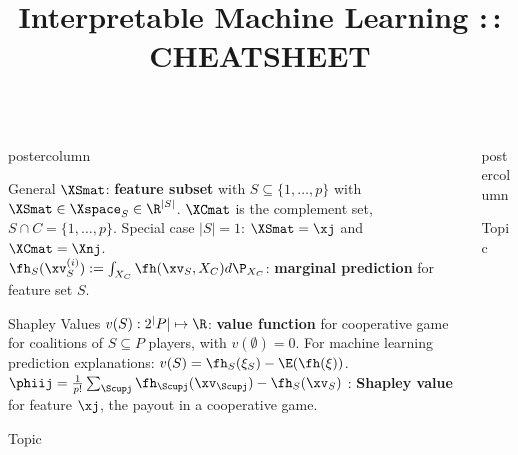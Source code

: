 \documentclass{beamer}
\title{Interpretable Machine Learning :\,: CHEATSHEET} %
\newlength{\columnheight} %
\begin{document}
\begin{frame}[fragile]{}
\vspace{-8ex}
\begin{columns}
	\begin{column}{.31\textwidth}
		\begin{beamercolorbox}[center]{postercolumn}
			\begin{minipage}{.98\textwidth}
				\parbox[t][\columnheight]{\textwidth}{
\begin{myblock}{General} \vspace{-2ex}
  $\XSmat$: \textbf{feature subset} with $S \subseteq \{1, \ldots, p\}$  with $\XSmat \in \Xspace_S \in \R^{|S|}$. $\XCmat$ is the complement set, $S \cap C = \{1, \ldots, p\}$. Special case $|S| = 1$: $\XSmat = \xj$ and $\XCmat = \Xnj$. \\

  $\fh_{S}(\xv_S^{(i)}) := \int_{X_C} \fh(\xv_S, X_C)d \P_{X_C}$: \textbf{marginal prediction} for feature set $S$. \\
\end{myblock}


\begin{myblock}{Shapley Values} \vspace{-2ex}
  $v(S): 2^|P| \mapsto \R$: \textbf{value function} for cooperative game for coalitions of $S \subseteq P$ players, with $v(\emptyset) = 0$. For machine learning prediction explanations: $v(S) =  \fh_{S} (\xi_S) - \E (\fh(\xi))$. \\

  $\phiij = \frac{1}{p!} \sum_{\Scupj} \fh_{\Scupj}(\xv_{\Scupj}) - \fh_{S}(\xv_{S})$ : \textbf{Shapley value} for feature $\xj$, the payout in a cooperative game. \\



\end{myblock}

\begin{myblock}{Topic} 

\end{myblock}
				}
			\end{minipage}
		\end{beamercolorbox}
	\end{column}
	\begin{column}{.31\textwidth}
		\begin{beamercolorbox}[center]{postercolumn}
			\begin{minipage}{.98\textwidth}
				\parbox[t][\columnheight]{\textwidth}{
\begin{myblock}{Topic} \vspace{-4ex}


\end{myblock}}
\end{minipage}
\end{beamercolorbox}
\end{column}
\end{columns}
\end{frame}
\end{document}
